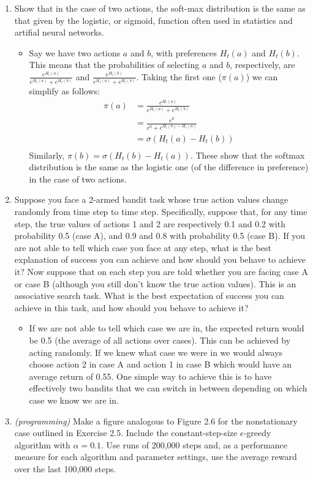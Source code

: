 \documentclass{article}
\begin{document}
\begin{enumerate}
    \item Show that in the case of two actions, the soft-max distribution is the same as that given by the logistic, or sigmoid, function often used in statistics and artifial neural networks.
    \begin{itemize}
        \item Say we have two actions $a$ and $b$, with preferences $H_t(a)$ and $H_t(b)$. This means that the probabilities of selecting $a$ and $b$, respectively, are $\frac{e^{H_t(a)}}{e^{H_t(a)} + e^{H_t(b)}}$ and $\frac{e^{H_t(b)}}{e^{H_t(a)} + e^{H_t(b)}}$. Taking the first one ($\pi(a)$) we can simplify as follows:
        \begin{align}
            \pi (a) &= \frac{e^{H_t(a)}}{e^{H_t(a)} + e^{H_t(b)}} \\
            &= \frac{e^{0}}{e^{0} + e^{H_t(b) - H_t(a)}} \\
            &= \sigma(H_t(a) - H_t(b)) \\
        \end{align}
        Similarly, $\pi(b) = \sigma(H_t(b) - H_t(a))$. These show that the softmax distribution is the same as the logistic one (of the difference in preference) in the case of two actions.
    \end{itemize}

    \item Suppose you face a 2-armed bandit task whose true action values change randomly from time step to time step. Specifically, suppose that, for any time step, the true values of actions 1 and 2 are respectively 0.1 and 0.2 with probability 0.5 (case A), and 0.9 and 0.8 with probability 0.5 (case B). If you are not able to tell which case you face at any step, what is the best explanation of success you can achieve and how should you behave to achieve it? Now suppose that on each step you are told whether you are facing case A or case B (although you still don't know the true action values). This is an associative search task. What is the best expectation of success you can achieve in this task, and how should you behave to achieve it?
    \begin{itemize}
        \item If we are not able to tell which case we are in, the expected return would be 0.5 (the average of all actions over cases). This can be achieved by acting randomly. If we knew what case we were in we would always choose action 2 in case A and action 1 in case B which would have an average return of 0.55. One simple way to achieve this is to have effectively two bandits that we can switch in between depending on which case we know we are in.
    \end{itemize}

    \item \emph{(programming)} Make a figure analogous to Figure 2.6 for the nonstationary case outlined in Exercise 2.5. Include the constant-step-size $\epsilon$-greedy algorithm with $\alpha=0.1$. Use runs of 200,000 steps and, as a performance measure for each algorithm and parameter settings, use the average reward over the last 100,000 steps.

\end{enumerate}
\end{document}

